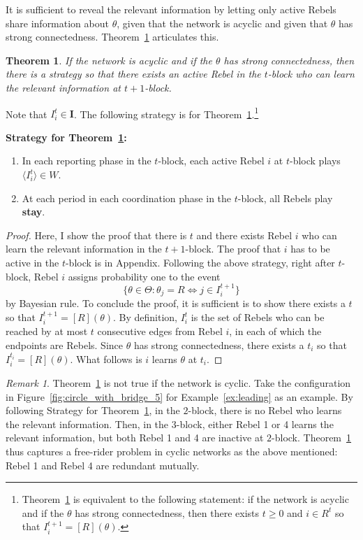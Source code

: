 \documentclass[12pt,letter]{article}
\newtheorem{theorem}{Theorem}
\theoremstyle{definition}
\theoremstyle{definition}
\theoremstyle{remark}
\newtheorem*{remark}{Remark}
\theoremstyle{claim}
\begin{document}
It is sufficient to reveal the relevant information by letting only active Rebels share information about $\theta$, given that the network is acyclic and given that $\theta$ has strong connectedness. Theorem~\ref{lemma_empty} articulates this.
\begin{theorem}
\label{lemma_empty}
If the network is acyclic and if the $\theta$ has strong connectedness, then there is a strategy so that there exists an active Rebel in the $t$-block who can learn the relevant information at $t+1$-block.
\end{theorem}
Note that $I^t_i\in \mathbf{I}$. The following strategy is for Theorem~\ref{lemma_empty}.\footnote{Theorem~\ref{lemma_empty} is equivalent to the following statement: if the network is acyclic and if the $\theta$ has strong connectedness, then there exists $t\geq 0$ and $i\in R^t$ so that $I^{t+1}_i=[R](\theta)$.} 
\begin{center}
\textbf{Strategy for Theorem~\ref{lemma_empty}:}
\begin{enumerate}
\item In each reporting phase in the $t$-block, each active Rebel $i$ at $t$-block plays $\langle {I^t_i} \rangle\in W$.
\item At each period in each coordination phase in the $t$-block, all Rebels play \textbf{stay}.
\end{enumerate}
\end{center}
\begin{proof} 
Here, I show the proof that there is $t$ and there exists Rebel $i$ who can learn the relevant information in the $t+1$-block. The proof that $i$ has to be active in the $t$-block is in Appendix.  Following the above strategy, right after $t$-block, Rebel $i$ assigns probability one to the event 
\[\{\theta\in \Theta: \text{$\theta_j=R \Leftrightarrow j\in I^{t+1}_i$}\}\] 
by Bayesian rule. To conclude the proof, it is sufficient is to show there exists a $t$ so that $I^{t+1}_i=[R](\theta)$. By definition, $I^t_i$ is the set of Rebels who can be reached by at most $t$ consecutive edges from Rebel $i$, in each of which the endpoints are Rebels. Since $\theta$ has strong connectedness, there exists a $t_i$ so that $I^{t_i}_i=[R](\theta)$. What follows is $i$ learns $\theta$ at $t_i$.
\end{proof}
\begin{remark}
Theorem~\ref{lemma_empty} is not true if the network is cyclic. Take the configuration in Figure~\ref{fig:circle_with_bridge_5} for Example~\ref{ex:leading} as an example. By following Strategy for Theorem~\ref{lemma_empty}, in the $2$-block, there is no Rebel who learns the relevant information. Then, in the $3$-block, either Rebel 1 or 4 learns the relevant information, but both Rebel 1 and 4 are inactive at $2$-block. Theorem~\ref{lemma_empty} thus captures a free-rider problem in cyclic networks as the above mentioned: Rebel 1 and Rebel 4 are redundant mutually.
\end{remark}
\end{document}
